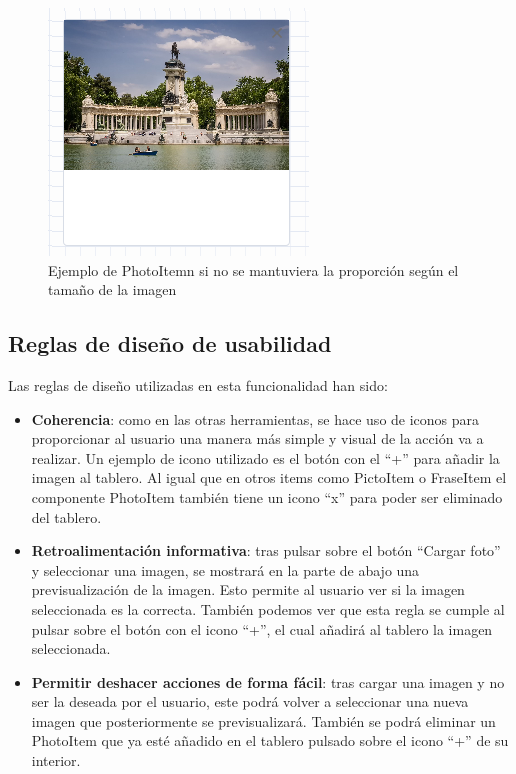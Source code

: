 \begin{figure}[h!]
	\centering
	\includegraphics[width=0.7\linewidth]{Imagenes/Bitmap/photoItemError}
	\caption{Ejemplo de PhotoItemn si no se mantuviera la proporción según el tamaño de la imagen}
	\label{fig:photoitemerror}
\end{figure}

\subsection{Reglas de diseño de usabilidad}

 Las reglas de diseño utilizadas en esta funcionalidad han sido:
\begin{itemize}
	\item \textbf{Coherencia}: como en las otras herramientas, se hace uso de iconos para proporcionar al usuario una manera más simple y visual de la acción va a realizar. Un ejemplo de icono utilizado es el botón con el “+” para añadir la imagen al tablero. Al igual que en otros items como PictoItem o FraseItem el componente PhotoItem también tiene un icono “x” para poder ser eliminado del tablero.
	
	\item \textbf{Retroalimentación informativa}: tras pulsar sobre el botón “Cargar foto” y seleccionar una imagen, se mostrará en la parte de abajo una previsualización de la imagen. Esto permite al usuario ver si la imagen seleccionada es la correcta.
	También podemos ver que esta regla se cumple al pulsar sobre el botón con el icono “+”, el cual añadirá al tablero la imagen seleccionada.
	
	
	\item \textbf{Permitir deshacer acciones de forma fácil}:  tras cargar una imagen y no ser la deseada por el usuario, este podrá volver a seleccionar una nueva imagen que posteriormente se previsualizará. También se podrá eliminar un PhotoItem que ya esté añadido en el tablero pulsado sobre el icono “+” de su interior.
	
\end{itemize}



